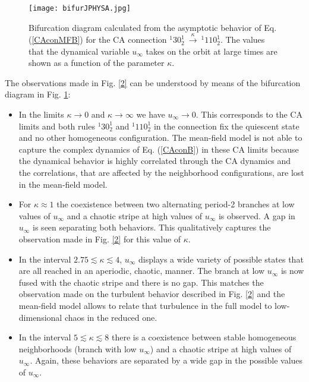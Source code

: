 \documentclass[aps,pre,preprint,floatfix]{revtex4}
\theoremstyle{plain} \newtheorem{defi}{Definition}[section]
\theoremstyle{plain} \newtheorem{prop}{Proposition}[section]
\theoremstyle{plain} \newtheorem{theor}{Theorem}[section]
\theoremstyle{plain} \newtheorem{lemma}{Lemma}[section]
\theoremstyle{plain} \newtheorem*{corol}{Corollary}
\theoremstyle{remark} \newtheorem*{rem}{Remark}
\theoremstyle{plain} \newtheorem{exer}{Exercise}[section]
\theoremstyle{remark} \newtheorem*{ans}{Answer}
\begin{document}
\begin{figure}
\texttt{[image: bifurJPHYSA.jpg]}
\caption{\scriptsize{Bifurcation diagram calculated from the asymptotic behavior of Eq. (\ref{CAconMFB}) for the CA connection $^{1}30_{2}^{1}\ \xrightarrow{\kappa}\ ^{1}110_{2}^{1}$. The values that the dynamical variable $u_{\infty}$ takes on the orbit at large times are shown as a function of the parameter $\kappa$.}} \label{3}
\end{figure}

 
The observations made in Fig. \ref{2} can be understood by means of the bifurcation diagram in Fig. \ref{3}:
 \begin{itemize}
\item In the limits $\kappa \to 0$ and $\kappa \to \infty$ we have $u_{\infty}\to 0$. This corresponds to the CA limits and both rules $^{1}30^{1}_{2}$ and $^{1}110^{1}_{2}$ in the connection fix the quiescent state and no other homogeneous configuration. The mean-field model is not able to capture the complex dynamics of Eq. (\ref{CAconB}) in these CA limits because the dynamical behavior is highly correlated through the CA dynamics and the correlations, that are affected by the neighborhood configurations, are lost in the mean-field model. 
\item For $\kappa \approx 1$ the coexistence between two alternating period-2 branches at low values of $u_{\infty}$ and a chaotic stripe at high values of $u_{\infty}$ is observed. A gap in $u_{\infty}$ is seen separating both behaviors. This qualitatively captures the observation made in Fig. \ref{2} for this value of $\kappa$.
\item In the interval $2.75\lesssim \kappa \lesssim 4$, $u_\infty$ displays a wide variety of possible states that are all reached in an aperiodic, chaotic, manner. The branch at low $u_\infty$ is now fused with the chaotic stripe and there is no gap. This matches the observation made on the turbulent behavior described in Fig. \ref{2} and the mean-field model allows to relate that turbulence in the full model to low-dimensional chaos in the reduced one.
\item In the interval $5\lesssim \kappa \lesssim 8$ there is a coexistence between stable homogeneous neighborhoods (branch with low $u_{\infty}$) and a chaotic stripe at high values of $u_{\infty}$. Again, these behaviors are separated by a wide gap in the possible values of $u_{\infty}$.
\end{itemize}
\end{document}
